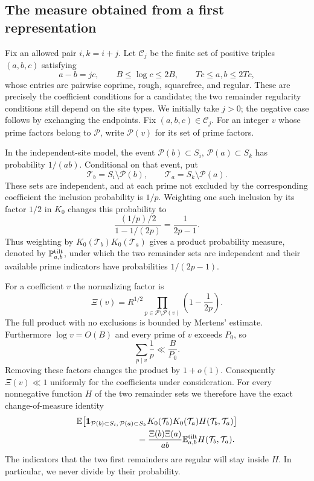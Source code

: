 \subsection{The measure obtained from a first representation}

Fix an allowed pair $i,k=i+j$. Let
$\mathcal C_j$ be the finite set of positive triples $(a,b,c)$ satisfying
\[
 a-b=jc,\qquad
 B\le\log c\le2B,\qquad Tc\le a,b\le2Tc,
\]
whose entries are pairwise coprime, rough, squarefree, and regular.
These are precisely the coefficient conditions for a candidate; the
two remainder regularity conditions still depend on the site types.
We initially take $j>0$; the negative case follows by exchanging the
endpoints. Fix $(a,b,c)\in\mathcal C_j$. For an integer $v$ whose prime
factors belong to $\mathcal P$, write $\mathcal P(v)$ for its set of prime
factors.

In the independent-site model, the event
$\mathcal P(b)\subset S_i$, $\mathcal P(a)\subset S_k$ has probability
$1/(ab)$.  Conditional on that event, put
\[
 \mathcal T_b=S_i\setminus\mathcal P(b),
 \qquad
 \mathcal T_a=S_k\setminus\mathcal P(a).
\]
These sets are independent, and at each prime not excluded by the
corresponding coefficient the inclusion probability is $1/p$.
Weighting one such inclusion by its factor $1/2$ in $K_0$ changes this
probability to
\[
 \frac{(1/p)/2}{1-1/(2p)}=\frac1{2p-1}.
\]
Thus weighting by $K_0(\mathcal T_b)K_0(\mathcal T_a)$ gives a product
probability measure, denoted by $\mathbb P^{\mathrm{tilt}}_{a,b}$, under which
the two remainder sets are independent and their available prime
indicators have probabilities $1/(2p-1)$.

For a coefficient $v$ the normalizing factor is
\[
 \Xi(v)=R^{1/2}
       \prod_{p\in\mathcal P\setminus\mathcal P(v)}
                    \left(1-\frac1{2p}\right).
\]
The full product with no exclusions is bounded by Mertens' estimate.
Furthermore $\log v=O(B)$ and every prime of $v$ exceeds $P_0$, so
\[
 \sum_{p\mid v}\frac1p\ll\frac{B}{P_0}.
\]
Removing these factors changes the product by $1+o(1)$.  Consequently
$\Xi(v)\ll1$ uniformly for the coefficients under consideration.
For every nonnegative function $H$ of the two remainder sets we therefore
have the exact change-of-measure identity
\[
 \begin{split}
 &\E\big[
   \ind_{\mathcal P(b)\subset S_i,\,\mathcal P(a)\subset S_k}
   K_0(\mathcal T_b)K_0(\mathcal T_a)H(\mathcal T_b,\mathcal T_a)
       \big]\\
 &\hspace{25mm}
   =\frac{\Xi(b)\Xi(a)}{ab}
       \E^{\mathrm{tilt}}_{a,b}H(\mathcal T_b,\mathcal T_a).
 \end{split}
\]
The indicators that the two first remainders are regular will stay
inside $H$.  In particular, we never divide by their probability.

